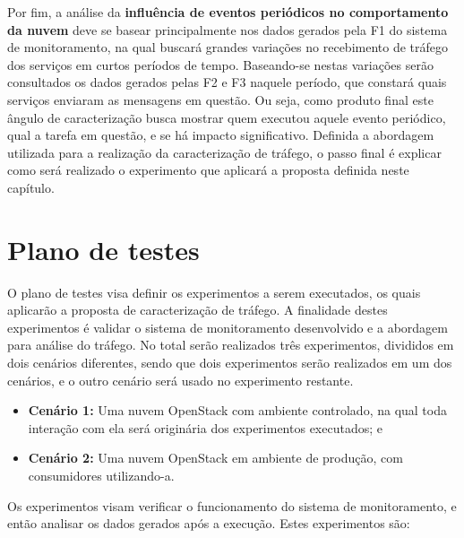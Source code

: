 Por fim, a análise da \textbf{influência de eventos periódicos no comportamento da nuvem} deve se basear principalmente nos dados gerados pela F1 do sistema de monitoramento, na qual buscará grandes variações no recebimento de tráfego dos serviços em curtos períodos de tempo.
%
Baseando-se nestas variações serão consultados os dados gerados pelas F2 e F3 naquele período, que constará quais serviços enviaram as mensagens em questão.
%
Ou seja, como produto final este ângulo de caracterização busca mostrar quem executou aquele evento periódico, qual a tarefa em questão, e se há impacto significativo.
%
Definida a abordagem utilizada para a realização da caracterização de tráfego, o passo final é explicar como será realizado o experimento que aplicará a proposta definida neste capítulo.


\section{Plano de testes}
\label{cap3:experimento}

O plano de testes visa definir os experimentos a serem executados, os quais aplicarão a proposta de caracterização de tráfego.
%
A finalidade destes experimentos é validar o sistema de monitoramento desenvolvido e a abordagem para análise do tráfego.
%
No total serão realizados três experimentos, divididos em dois cenários diferentes, sendo que dois experimentos serão realizados em um dos cenários, e o outro cenário será usado no experimento restante.

\begin{itemize}
\item \textbf{Cenário 1:} Uma nuvem OpenStack com ambiente controlado, na qual toda interação com ela será originária dos experimentos executados; e

\item \textbf{Cenário 2:} Uma nuvem OpenStack em ambiente de produção, com consumidores utilizando-a.
\end{itemize}

Os experimentos visam verificar o funcionamento do sistema de monitoramento, e então analisar os dados gerados após a execução. 
%
Estes experimentos são:

